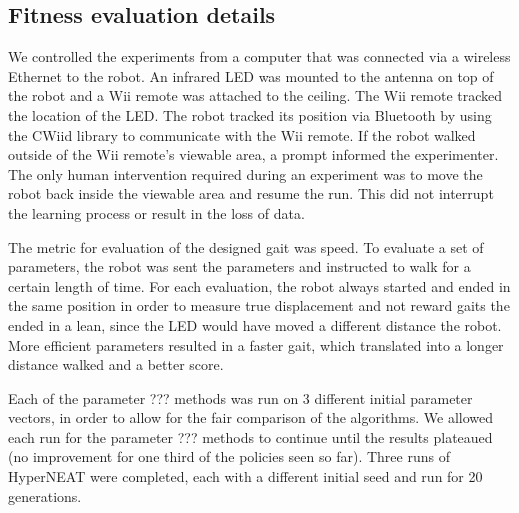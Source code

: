 \subsection{Fitness evaluation details}



We controlled the experiments from a computer that was connected via a
wireless Ethernet to the robot. An infrared LED was mounted to the
antenna on top of the robot and a Wii remote was attached to the
ceiling. The Wii remote tracked the location of the LED. The robot
tracked its position via Bluetooth by using the CWiid
library\cite{cwiid} to communicate with the Wii remote. If the robot
walked outside of the Wii remote's viewable area, a prompt informed
the experimenter. The only human intervention required during an
experiment was to move the robot back inside the viewable area and
resume the run. This did not interrupt the learning process or result
in the loss of data.

The metric for evaluation of the designed gait was speed. To evaluate
a set of parameters, the robot was sent the parameters and instructed
to walk for a certain length of time. For each evaluation, the robot
always started and ended in the same position in order to measure true
displacement and not reward gaits the ended in a lean, since the LED
would have moved a different distance the robot. More efficient
parameters resulted in a faster gait, which translated into a longer
distance walked and a better score.

Each of the parameter ??? methods was run on 3 different initial
parameter vectors, in order to allow for the fair comparison of the
algorithms. We allowed each run for the parameter ??? methods to
continue until the results plateaued (no improvement for one third of
the policies seen so far). Three runs of HyperNEAT were completed,
each with a different initial seed and run for 20 generations.
